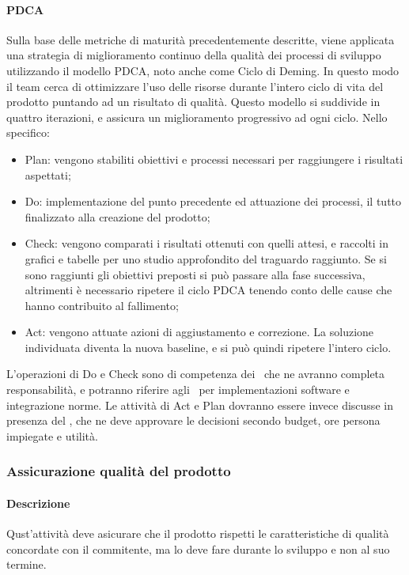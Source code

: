 \documentclass[../NormeDiProgetto_v4.0.0.tex]{subfiles}
\begin{document}
					\paragraph{PDCA}
					Sulla base delle metriche di maturità precedentemente descritte, viene applicata una strategia di miglioramento continuo della qualità dei processi di sviluppo utilizzando il modello PDCA, noto anche come Ciclo di Deming. In questo modo il team cerca di ottimizzare l'uso delle risorse durante l'intero ciclo di vita del prodotto puntando ad un risultato di qualità. Questo modello si suddivide in quattro iterazioni, e assicura un miglioramento progressivo ad ogni ciclo. Nello specifico: 
					\begin{itemize}
						\item Plan: vengono stabiliti obiettivi e processi necessari per raggiungere i risultati aspettati;
						\item Do: implementazione del punto precedente ed attuazione dei processi, il tutto finalizzato alla creazione del prodotto;
						\item Check: vengono comparati i risultati ottenuti con quelli attesi, e raccolti in grafici e tabelle per uno studio approfondito del traguardo raggiunto. Se si sono raggiunti gli obiettivi preposti si può passare alla fase successiva, altrimenti è necessario ripetere il ciclo PDCA tenendo conto delle cause che hanno contribuito al fallimento;
						\item Act: vengono attuate azioni di aggiustamento e correzione. La soluzione individuata diventa la nuova baseline, e si può quindi ripetere l'intero ciclo.
					\end{itemize}
					L'operazioni di Do e Check sono di competenza dei \verificatori\ che ne avranno completa responsabilità, e potranno riferire agli \amministratori\ per implementazioni software e integrazione norme.
					Le attività di Act e Plan dovranno essere invece discusse in presenza del \responsabilediprogetto, che ne deve approvare le decisioni secondo budget, ore persona impiegate e utilità.
			
			\subsubsection{Assicurazione qualità del prodotto}
				\paragraph{Descrizione}
					Qust'attività deve asicurare che il prodotto rispetti le caratteristiche di qualità concordate con il commitente, ma lo deve fare durante lo sviluppo e non al suo termine.
\end{document}
